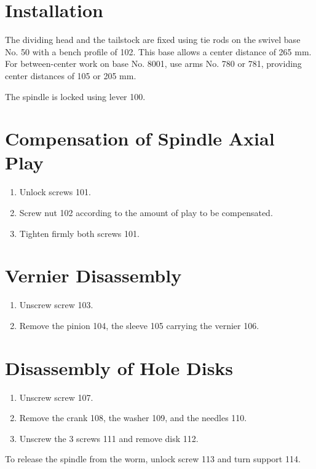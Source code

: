 \section*{Installation}
The dividing head and the tailstock are fixed using tie rods on the swivel base No. 50 with a bench profile of 102.
This base allows a center distance of 265 mm.
For between-center work on base No. 8001, use arms No. 780 or 781, providing center distances of 105 or 205 mm.

The spindle is locked using lever 100.

\section*{Compensation of Spindle Axial Play}
\begin{enumerate}
    \item Unlock screws 101.
    \item Screw nut 102 according to the amount of play to be compensated.
    \item Tighten firmly both screws 101.
\end{enumerate}

\section*{Vernier Disassembly}
\begin{enumerate}
    \item Unscrew screw 103.
    \item Remove the pinion 104, the sleeve 105 carrying the vernier 106.
\end{enumerate}

\section*{Disassembly of Hole Disks}
\begin{enumerate}
    \item Unscrew screw 107.
    \item Remove the crank 108, the washer 109, and the needles 110.
    \item Unscrew the 3 screws 111 and remove disk 112.
\end{enumerate}

To release the spindle from the worm, unlock screw 113 and turn support 114.
